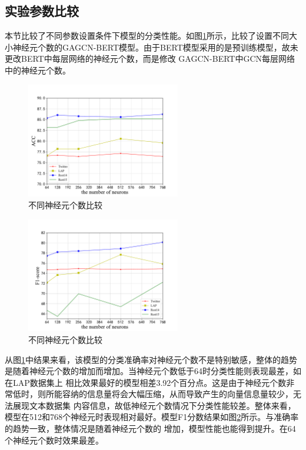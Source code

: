 \subsection{实验参数比较}
本节比较了不同参数设置条件下模型的分类性能。如图\ref{paraunitacc}所示，比较了设置不同大小神经元个数的GAGCN-BERT模型。由于BERT模型采用的是预训练模型，故未更改BERT中每层网络的神经元个数，而是修改
GAGCN-BERT中GCN每层网络中的神经元个数。

\begin{figure}[htb]
    \setlength{\belowcaptionskip}{0pt}
    \centering
    \includegraphics[width=0.6\textwidth]{pic/unitACC.pdf}
    \caption{不同神经元个数比较}
    \label{paraunitacc}
\end{figure}

\begin{figure}[htb]
    \setlength{\belowcaptionskip}{0pt}
    \centering
    \includegraphics[width=0.6\textwidth]{pic/unitF1.pdf}
    \caption{不同神经元个数比较}
    \label{paraunitf1}
\end{figure}

从图\ref{paraunitacc}中结果来看，该模型的分类准确率对神经元个数不是特别敏感，整体的趋势是随着神经元个数的增加而增加。当神经元个数低于64时分类性能则表现最差，如在LAP数据集上
相比效果最好的模型相差3.92个百分点。这是由于神经元个数非常低时，则所能容纳的信息量将会大幅压缩，从而导致产生的向量信息量较少，无法展现文本数据集
内容信息，故低神经元个数情况下分类性能较差。整体来看，模型在512和768个神经元时表现相对最好。模型F1分数结果如图\ref{paraunitf1}所示。与准确率的趋势一致，整体情况是随着神经元个数的
增加，模型性能也能得到提升。在64个神经元个数时效果最差。

